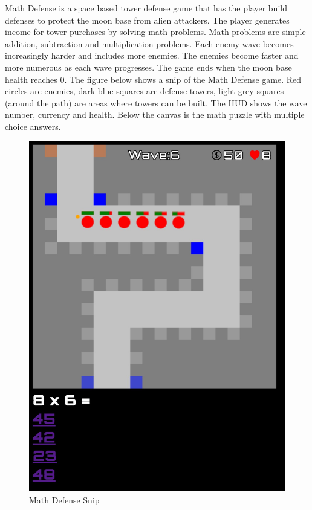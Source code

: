 \documentclass[12pt]{article}
\begin{document}
    Math Defense is a space based tower defense game that has the player build defenses to protect the moon base from alien attackers.  The player generates income for tower purchases by solving math problems.  Math problems are simple addition, subtraction and multiplication problems. Each enemy wave becomes increasingly harder and includes more enemies.  The enemies become faster and more numerous as each wave progresses.   The game ends when the moon base health reaches 0. The figure below shows a snip of the Math Defense game.  Red circles are enemies, dark blue squares are defense towers, light grey squares (around the path) are areas where towers can be built.  The HUD shows the wave number, currency and health.  Below the canvas is the math puzzle with multiple choice answers\cite{MozJS}\cite{RMO}\cite{CanCC}.
    \begin{figure}[ht]
        \centering
            \includegraphics[height=0.30\textheight]{mathDefenseSnip.jpg}
            \caption{Math Defense Snip}
    \end{figure}

\newpage
\printbibliography
\end{document}
